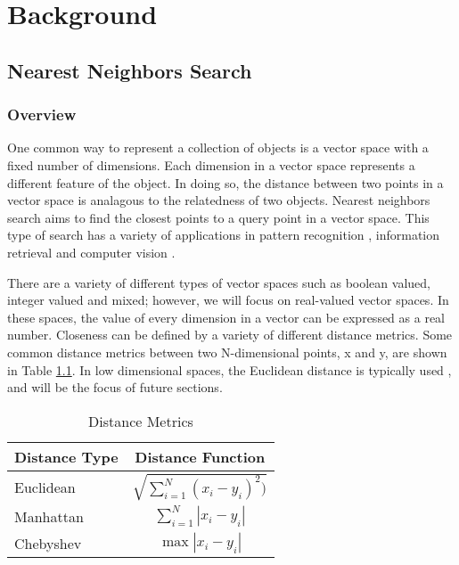 \chapter{Background} %

\label{Background} %


\section{Nearest Neighbors Search}

\subsection{Overview}

One common way to represent a collection of objects is a vector space with a fixed number of dimensions.  Each dimension in a vector space represents a different feature of the object.  In doing so, the distance between two points in a vector space is analagous to the relatedness of two objects.  Nearest neighbors search aims to find the closest points to a query point in a vector space.  This type of search has a variety of applications in pattern recognition \citep{cover1967nearest}, information retrieval \citep{manning2008introduction} and computer vision \citep{boiman2008defense}.

There are a variety of different types of vector spaces such as boolean valued, integer valued and mixed; however, we will focus on real-valued vector spaces.  In these spaces, the value of every dimension in a vector can be expressed as a real number.  Closeness can be defined by a variety of different distance metrics.  Some common distance metrics between two N-dimensional points, x and y, are shown in Table \ref{table:distancemet}.  In low dimensional spaces, the Euclidean distance is typically used \citep{danielsson1980euclidean}, and will be the focus of future sections.

\begin{table}
\centering
\begin{tabular}{ | l | c |}
	\hline
	Distance Type & Distance Function \\
	\hline
	Euclidean & $\sqrt{\sum\limits_{i=1}^N (x_i - y_i)^2)}$ \\
	\hline
	Manhattan & $\sum\limits_{i=1}^N |x_i - y_i|$ \\
	\hline
	Chebyshev & $\max{|x_i - y_i|}$ \\
	\hline
\end{tabular}
\caption{Distance Metrics}
\label{table:distancemet}
\end{table}

